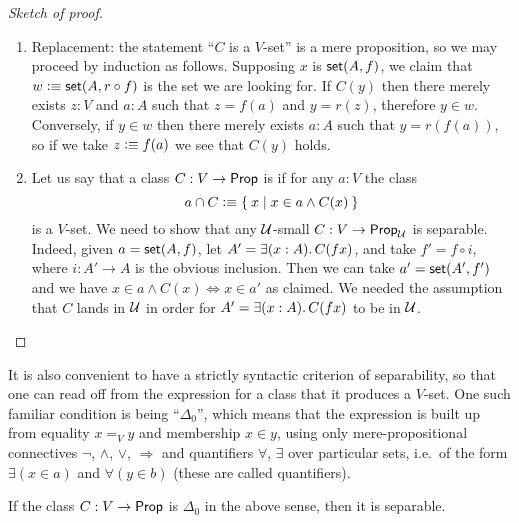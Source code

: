 \begin{proof}[Sketch of proof]
\begin{enumerate}
  \item Replacement: the statement ``$C$ is a $V$-set'' is a mere proposition, so we may
    proceed by induction as follows. Supposing $x$ is $\mathsf{set}(A, f)$, we claim that $w
    \vcentcolon\equiv \mathsf{set}(A, r \circ f)$ is the set we are looking for.  If $C(y)$ then there merely exists
    $z : V$ and $a : A$ such that $z = f(a)$ and $y = r(z)$, therefore $y \in w$.
    Conversely, if $y \in w$ then there merely exists $a : A$ such that $y = r(f(a))$, so
    if we take $z \vcentcolon\equiv f(a)$ we see that $C(y)$ holds.

  \item Let us say that a class $C: V\to\mathsf{Prop}$ is 
    if for any $a:V$ the class
  \begin{equation*}
    a \cap C \vcentcolon\equiv\Set{x | x\in a \wedge C(x)}
  \end{equation*}
  is a $V$-set.
We need to show that any $\mathcal{U}$-small  $C: V \to \mathsf{Prop}_\mathcal{U}$ is separable. Indeed, given $a=\mathsf{set}(A,f)$, let $A' = \exis{x:A}C(fx)$, and take $f' = f\circ i$, where $i : A' \to A$ is the obvious inclusion.  Then we can take $a' = \mathsf{set}(A',f')$ and we have $x\in a\wedge C(x) \Leftrightarrow x\in a'$ as claimed.  We needed the assumption that $C$ lands in $\mathcal{U}$ in order for $A' = \exis{x:A}C(fx)$ to be in $\mathcal{U}$.\qedhere
\end{enumerate}
\end{proof}

It is also convenient to have a strictly syntactic criterion of separability, so that one can read off from the expression for a class that it produces a $V$-set.  One such familiar condition is being ``$\Delta_0$'', which means that the expression is built up from equality $x=_V y$ and membership $x\in y$, using only mere-propositional connectives $\neg$, $\land$, $\lor$, $\Rightarrow$ and quantifiers $\forall$, $\exists$ over particular sets, i.e.\ of the form $\exists(x\in a)$ and $\forall(y\in b)$ (these are called  quantifiers).%

\begin{cor}\label{cor:Delta0sep}
If the class $C: V \to \mathsf{Prop}$ is $\Delta_0$ in the above sense, then it is separable.
\end{cor}
%

